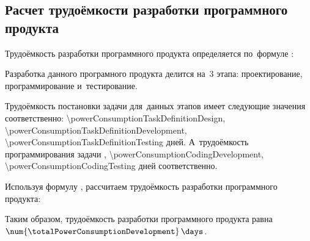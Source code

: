 \subsection{Расчет трудоёмкости разработки программного продукта}
\label{sec:economics:developmenteffort}

Трудоёмкость разработки программного продукта определяется по~формуле :
\powerConsumptionDevelopmentEquation

Разработка данного програмного продукта делится на~3 этапа: проектирование, программирование и~тестирование.

Трудоёмкость постановки задачи для~данных этапов имеет следующие значения соответственно: \num{\powerConsumptionTaskDefinitionDesign}, \num{\powerConsumptionTaskDefinitionDevelopment}, \num{\powerConsumptionTaskDefinitionTesting} \! дней. А~трудоёмкость программирования задачи \powerConsumptionCodingDesign, \num{\powerConsumptionCodingDevelopment}, \num{\powerConsumptionCodingTesting} \! дней соответственно.

Используя формулу , рассчитаем трудоёмкость разработки программного продукта:
\powerConsumptionDevelopmentFormulaApplied

Таким образом, трудоёмкость разработки программного продукта равна \(\num{\totalPowerConsumptionDevelopment} \, \days\).